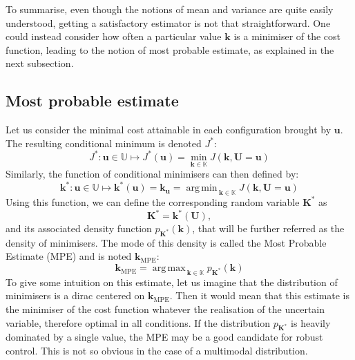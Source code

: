 \documentclass[preprint, 1p]{elsarticle}
\DeclareMathOperator*{\argmin}{arg\,min \,}
\DeclareMathOperator*{\argmax}{arg\,max \,}
\newcommand{\kmpe}{{\mathbf{k}}_{\mathrm{MPE}}}
\newcommand{\Kspace}{\mathbb{K}}
\newcommand{\Uspace}{\mathbb{U}}
\begin{document}
To summarise, even though the notions of mean and variance are quite easily understood, getting a satisfactory estimator is not that straightforward. One could instead consider how often a particular value $\mathbf{k}$ is a minimiser of the cost function, leading to the notion of most probable estimate, as explained in the next subsection.

\subsection{Most probable estimate}
Let us consider the minimal cost attainable in each configuration brought by $\mathbf{u}$.
The resulting conditional minimum is denoted $J^*$:
\begin{equation}
\label{eq:def_Jstar}
J^*: \mathbf{u} \in\Uspace \longmapsto J^*(\mathbf{u}) = \min_{\mathbf{k}\in \Kspace} J(\mathbf{k},\mathbf{U}=\mathbf{u})
\end{equation}
Similarly, the function of conditional minimisers can then defined by:
  \begin{equation}
  \label{eq:conditional_minimiser}
   \mathbf{k}^*: \mathbf{u}\in\Uspace \longmapsto \mathbf{k}^*(\mathbf{u}) = \mathbf{k}_{\mathbf{u}}=  \argmin_{{\mathbf{k}}\in\Kspace} J({\mathbf{k}},\mathbf{U}=\mathbf{u})
  \end{equation}
Using this function, we can define the corresponding random variable $\mathbf{K}^*$ as
  \begin{equation}
    \label{eq:def_study_minimisers}
    \mathbf{K}^*= \mathbf{k}^*(\mathbf{U}),
  \end{equation}
and its associated density function $p_{\mathbf{K}^*}(\mathbf{k})$, that will be further referred as the density of minimisers.
The mode of this density is called the Most Probable Estimate (MPE) and is noted  $\kmpe$:
\begin{equation}
  \label{eq:MPE}
  \kmpe = \argmax_{\mathbf{k} \in\Kspace} p_{\mathbf{K}^*}(\mathbf{k}) 
\end{equation}
To give some intuition on this estimate, let us imagine that the distribution of minimisers is a dirac centered on $\kmpe$. Then it would mean that this estimate is the minimiser of the cost function whatever the realisation of the uncertain variable, therefore optimal in all conditions. 
If the distribution $p_{\mathbf{K}^*}$ is heavily dominated by a single value, the MPE may be a good candidate for robust control. This is not so obvious in the case of a multimodal distribution.
\end{document}

